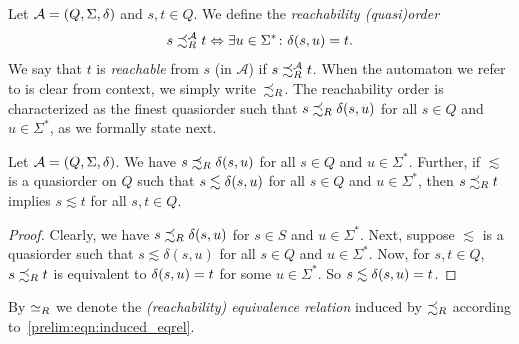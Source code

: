 
Let $\mathcal A = (Q, \Sigma, \delta)$ and $s,t \in Q$. We define the \emph{reachability (quasi)order} 
\[
s \precsim_R^{\mathcal A} t 
\Leftrightarrow 
\exists u \in \Sigma^* \colon \delta(s,u) = t. \label{def:reach_order}
\]
We say that $t$ is \emph{reachable} from $s$ (in $\mathcal A$) if $s \precsim_R^{\mathcal A} t$. 
When the automaton we refer to is clear from context, we simply write~$\precsim_R$.
The reachability order is characterized as the finest quasiorder such that $s \precsim_R \delta(s,u)$
for all $s \in Q$ and~$u \in \Sigma^*$, as we formally state next.

\begin{proposition}
	\label{prelim:prop:reachability-finest}
	Let $\mathcal A = (Q, \Sigma, \delta)$. We have $s \precsim_R \delta(s,u)$ for all $s \in Q$ and $u \in \Sigma^*$.
	Further, if $\lesssim$ is a quasiorder on $Q$
	such that $s \lesssim \delta(s,u)$
	for all $s \in Q$ and $u \in \Sigma^*$,
	then $s \precsim_R t$ implies $s \lesssim t$ for all $s,t \in Q$.
\end{proposition} 
\begin{proof}
	Clearly, we have $s \precsim_R \delta(s,u)$ for $s \in S$ and $u \in \Sigma^*$.
	Next, suppose $\lesssim$
	is a quasiorder such that $s \lesssim \delta(s, u)$ for all $s \in Q$ and $u \in \Sigma^*$. 
	Now, for $s,t \in Q$, $s \precsim_R t$ is equivalent to $\delta(s,u) = t$
	for some $u \in \Sigma^*$. So $s \lesssim \delta(s,u) = t$.  
\end{proof}

\label{def:induced_reach_order} 
By $\simeq_R$ we denote the \emph{(reachability) equivalence relation} induced by $\precsim_R$ 
according to~\cref{prelim:eqn:induced_eqrel}.
